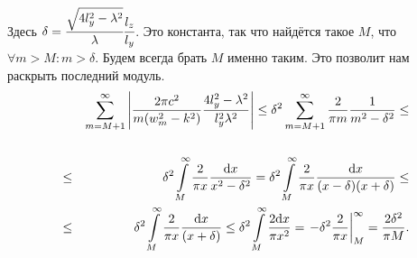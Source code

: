 Здесь $\delta{} = \cfrac{\sqrt{4l_y^2 - \lambda^2}}{\lambda}\cfrac{l_z}{l_y}$. Это константа, так что найдётся такое $M$, что \\$\forall m > M \colon m > \delta{}$. Будем всегда брать $M$ именно таким. Это позволит нам раскрыть последний модуль.
\begin{eqnarray*}
  & &\sum \limits_{m=M+1}^{\infty} \left| \frac{2\pi c^2}{m(w_m^2 - k^2)} \frac{4l_y^2 - \lambda^2}{l_y^2\lambda^2} \right| \leq \delta{}^2 \sum \limits_{m=M+1}^{\infty} \frac{2}{\pi m} \frac{1}{m^2 - \delta{}^2} \leq\\
  \\
  &\leq& \delta{}^2 \int \limits_M^{\infty} \frac{2}{\pi x} \frac{\mathrm{d} x}{x^2 - \delta{}^2} = \delta{}^2 \int \limits_M^{\infty} \frac{2}{\pi x} \frac{\mathrm{d} x}{(x - \delta{}) (x + \delta{})} \leq \\
  &\leq& \delta{}^2 \int \limits_M^{\infty} \frac{2}{\pi x} \frac{\mathrm{d} x}{(x + \delta{})} \leq \delta{}^2 \int \limits_M^{\infty} \frac{2 \mathrm{d} x}{\pi x^2} = \left. - \delta{}^2 \frac{2}{\pi x} \right|_M^{\infty} = \frac{2 \delta{}^2}{\pi M}.
\end{eqnarray*}

